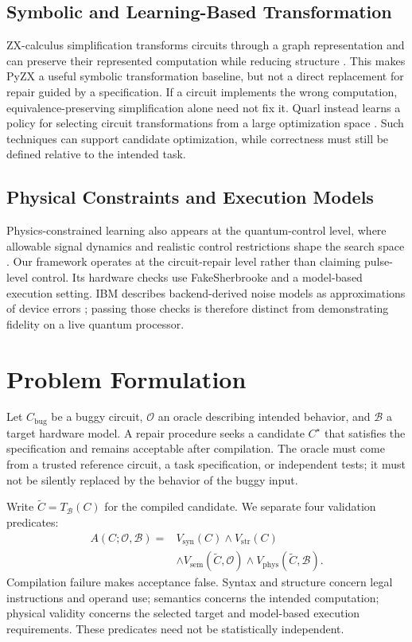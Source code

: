 \documentclass[conference]{IEEEtran}
\begin{document}
\subsection{Symbolic and Learning-Based Transformation}
ZX-calculus simplification transforms circuits through a graph representation and can preserve their represented computation while reducing structure \cite{duncan2020graph}. This makes PyZX a useful symbolic transformation baseline, but not a direct replacement for repair guided by a specification. If a circuit implements the wrong computation, equivalence-preserving simplification alone need not fix it. Quarl instead learns a policy for selecting circuit transformations from a large optimization space \cite{quarl2024}. Such techniques can support candidate optimization, while correctness must still be defined relative to the intended task.

\subsection{Physical Constraints and Execution Models}
Physics-constrained learning also appears at the quantum-control level, where allowable signal dynamics and realistic control restrictions shape the search space \cite{ernst2025physical}. Our framework operates at the circuit-repair level rather than claiming pulse-level control. Its hardware checks use FakeSherbrooke and a model-based execution setting. IBM describes backend-derived noise models as approximations of device errors \cite{ibmnoise}; passing those checks is therefore distinct from demonstrating fidelity on a live quantum processor.

\section{Problem Formulation}
Let $C_{\mathrm{bug}}$ be a buggy circuit, $\mathcal{O}$ an oracle describing intended behavior, and $\mathcal{B}$ a target hardware model. A repair procedure seeks a candidate $C^\star$ that satisfies the specification and remains acceptable after compilation. The oracle must come from a trusted reference circuit, a task specification, or independent tests; it must not be silently replaced by the behavior of the buggy input.

Write $\widetilde C=T_{\mathcal B}(C)$ for the compiled candidate. We separate four validation predicates:
\begin{equation}
\begin{split}
 A(C;\mathcal O,\mathcal B)={}&V_{\mathrm{syn}}(C)\land V_{\mathrm{str}}(C)\\
 &\land V_{\mathrm{sem}}(\widetilde C,\mathcal O)
 \land V_{\mathrm{phys}}(\widetilde C,\mathcal B).
\end{split}
\label{eq:accept}
\end{equation}
Compilation failure makes acceptance false. Syntax and structure concern legal instructions and operand use; semantics concerns the intended computation; physical validity concerns the selected target and model-based execution requirements. These predicates need not be statistically independent.
\end{document}
